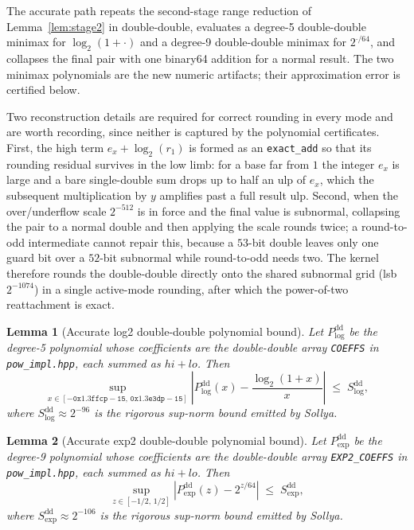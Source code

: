 \documentclass[11pt]{article}
\theoremstyle{plain}
\newtheorem{lemma}{Lemma}
\theoremstyle{remark}
\begin{document}
The accurate path repeats the second-stage range reduction of
Lemma~\ref{lem:stage2} in double-double, evaluates a degree-5 double-double
minimax for $\log_2(1+\cdot)$ and a degree-9 double-double minimax for
$2^{\cdot/64}$, and collapses the final pair with one binary64 addition for a
normal result.  The
two minimax polynomials are the new numeric artifacts; their approximation
error is certified below.

Two reconstruction details are required for correct rounding in every mode and
are worth recording, since neither is captured by the polynomial certificates.
First, the high term $e_x + \log_2(r_1)$ is formed as an \texttt{exact\_add} so
that its rounding residual survives in the low limb: for a base far from $1$ the
integer $e_x$ is large and a bare single-double sum drops up to half an ulp of
$e_x$, which the subsequent multiplication by $y$ amplifies past a full result
ulp.  Second, when the over/underflow scale $2^{-512}$ is in force and the final
value is subnormal, collapsing the pair to a normal double and then applying the
scale rounds twice; a round-to-odd intermediate cannot repair this, because a
$53$-bit double leaves only one guard bit over a $52$-bit subnormal while
round-to-odd needs two.  The kernel therefore rounds the double-double directly
onto the shared subnormal grid (lsb $2^{-1074}$) in a single active-mode
rounding, after which the power-of-two reattachment is exact.

\begin{lemma}[Accurate log2 double-double polynomial bound]
\label{lem:supnorm-log-dd}
Let $P_{\!\log}^{\mathrm{dd}}$ be the degree-5 polynomial whose coefficients are
the double-double array \texttt{COEFFS} in \texttt{pow\_impl.hpp}, each summed as
$\mathit{hi}+\mathit{lo}$.  Then
\[
  \sup_{x \in [-\mathtt{0x1.3ffcp-15},\,\mathtt{0x1.3e3dp-15}]}
  \left| P_{\!\log}^{\mathrm{dd}}(x) - \frac{\log_2(1+x)}{x} \right|
  \;\le\; S_{\log}^{\mathrm{dd}},
\]
where $S_{\log}^{\mathrm{dd}} \approx 2^{-96}$ is the rigorous sup-norm bound
emitted by Sollya.
\end{lemma}

\begin{lemma}[Accurate exp2 double-double polynomial bound]
\label{lem:supnorm-exp-dd}
Let $P_{\!\exp}^{\mathrm{dd}}$ be the degree-9 polynomial whose coefficients are
the double-double array \texttt{EXP2\_COEFFS} in \texttt{pow\_impl.hpp}, each
summed as $\mathit{hi}+\mathit{lo}$.  Then
\[
  \sup_{z \in [-1/2,\,1/2]}
  \left| P_{\!\exp}^{\mathrm{dd}}(z) - 2^{z/64} \right|
  \;\le\; S_{\exp}^{\mathrm{dd}},
\]
where $S_{\exp}^{\mathrm{dd}} \approx 2^{-106}$ is the rigorous sup-norm bound
emitted by Sollya.
\end{lemma}
\end{document}
